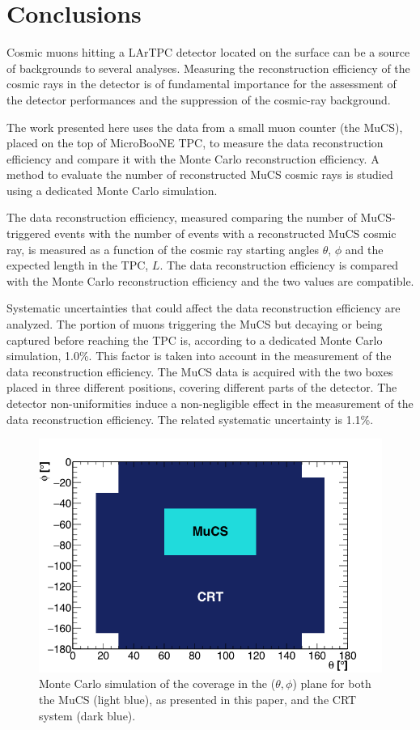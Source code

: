 \documentclass[a4paper,11pt]{article}
\begin{document}
\section{Conclusions}
Cosmic muons hitting a LArTPC detector located on the surface can be a source of backgrounds to several analyses. Measuring the reconstruction efficiency of the cosmic rays in the detector is of fundamental importance for the assessment of the detector performances and the suppression of the cosmic-ray background.

The work presented here uses the data from a small muon counter (the MuCS), placed on the top of MicroBooNE TPC, to measure the data reconstruction efficiency and compare it with the Monte Carlo reconstruction efficiency.
A method to evaluate the number of reconstructed MuCS cosmic rays is studied using a dedicated Monte Carlo simulation.

The data reconstruction efficiency, measured comparing the number of MuCS-triggered events with the number of events with a reconstructed MuCS cosmic ray, is measured as a function of the cosmic ray starting angles $\theta$, $\phi$ and the expected length in the TPC, $L$. The data reconstruction efficiency is compared with the Monte Carlo reconstruction efficiency and the two values are compatible.

Systematic uncertainties that could affect the data reconstruction efficiency are analyzed. The portion of muons triggering the MuCS but decaying or being captured before reaching the TPC is, according to a dedicated Monte Carlo simulation, 1.0\%. This factor is taken into account in the measurement of the data reconstruction efficiency.
The MuCS data is acquired with the two boxes placed in three different positions, covering different parts of the detector. The detector non-uniformities induce a non-negligible effect in the measurement of the data reconstruction efficiency. The related systematic uncertainty is 1.1\%.

\begin{figure}[htbp]
  \begin{center}
    \includegraphics[width=0.7\linewidth]{figures/crt.png}
    \caption{Monte Carlo simulation of the coverage in the ($\theta,\phi$) plane for both the MuCS (light blue), as presented in this paper, and the CRT system (dark blue).} \label{fig:crt}
  \end{center}
\end{figure}
\end{document}
